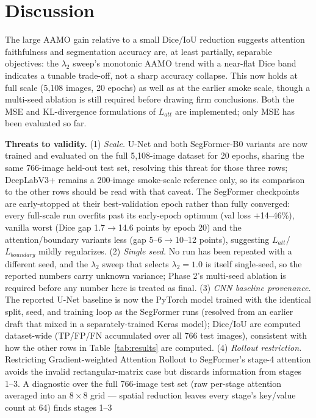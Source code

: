 \documentclass[sigconf,review]{acmart}
\begin{document}
\section{Discussion}
\label{sec:discussion}
The large AAMO gain relative to a small Dice/IoU reduction suggests
attention faithfulness and segmentation accuracy are, at least partially,
separable objectives: the $\lambda_2$ sweep's monotonic AAMO trend with a
near-flat Dice band indicates a tunable trade-off, not a sharp accuracy
collapse. This now holds at full scale (5{,}108
images, 20 epochs) as well as at the earlier smoke scale, though a
multi-seed ablation is still required before drawing firm conclusions. Both
the MSE and KL-divergence formulations of $L_{att}$ are implemented; only
MSE has been evaluated so far.

\textbf{Threats to validity.} (1) \emph{Scale.} U-Net and both SegFormer-B0
variants are now trained and evaluated on the full 5{,}108-image dataset for
20 epochs, sharing the same 766-image held-out test set, resolving this
threat for those three rows; DeepLabV3+ remains a 200-image smoke-scale
reference only, so its comparison to the other rows should be read with that
caveat. The SegFormer checkpoints are early-stopped at their best-validation
epoch rather than fully converged: every full-scale run overfits past its
early-epoch optimum (val loss $+$14--46\%), vanilla worst (Dice gap
1.7$\to$14.6 points by epoch 20) and the attention/boundary variants less
(gap 5--6$\to$10--12 points), suggesting $L_{att}$/$L_{boundary}$ mildly
regularizes. (2) \emph{Single seed.} No run has been
repeated with a different seed, and the $\lambda_2$ sweep that selects
$\lambda_2{=}1.0$ is itself single-seed, so the reported numbers carry
unknown variance; Phase 2's multi-seed ablation is required before any
number here is treated as final.
(3) \emph{CNN baseline provenance.} The reported U-Net baseline is now the
PyTorch model trained with the identical split, seed, and training loop as
the SegFormer runs (resolved from an earlier draft that mixed in a
separately-trained Keras model); Dice/IoU are computed dataset-wide
(TP/FP/FN accumulated over all 766 test images), consistent with how the
other rows in Table~\ref{tab:results} are computed. (4) \emph{Rollout
restriction.}
Restricting Gradient-weighted Attention Rollout to SegFormer's stage-4
attention avoids the invalid rectangular-matrix case but discards
information from stages 1--3. A diagnostic over the full 766-image test
set (raw per-stage attention averaged into an $8{\times}8$ grid --- spatial
reduction leaves every stage's key/value count at 64) finds stages 1--3
\end{document}

